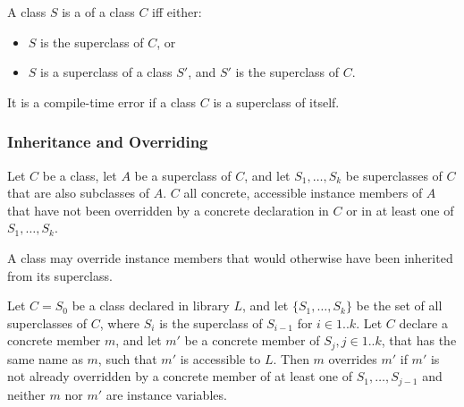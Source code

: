\documentclass[makeidx]{article}
\begin{document}
\LMHash{}%
A class $S$ is a  of a class $C$ if{}f either:
\begin{itemize}
\item $S$ is the superclass of $C$, or
\item $S$ is a superclass of a class $S'$,
and $S'$ is the superclass of $C$.
\end{itemize}

\LMHash{}%
It is a compile-time error if a class $C$ is a superclass of itself.


\subsubsection{Inheritance and Overriding}

\LMHash{}%
Let $C$ be a class, let $A$ be a superclass of $C$, and
let $S_1, \ldots, S_k$ be superclasses of $C$ that are also subclasses of $A$.
$C$  all concrete, accessible instance members of $A$
that have not been overridden by a concrete declaration in $C$ or in at least one of $S_1, \ldots, S_k$.


\LMHash{}%
A class may override instance members that would otherwise have been inherited from its superclass.

\LMHash{}%
Let $C = S_0$ be a class declared in library $L$, and
let $\{S_1, \ldots, S_k\}$ be the set of all superclasses of $C$,
where $S_i$ is the superclass of $S_{i-1}$ for $i \in 1 .. k$.
Let $C$ declare a concrete member $m$, and
let $m'$ be a concrete member of $S_j, j \in 1 .. k$, that has the same name as $m$,
such that $m'$ is accessible to $L$.
Then $m$ overrides $m'$
if $m'$ is not already overridden by a concrete member of at least one of $S_1, \ldots, S_{j-1}$
and neither $m$ nor $m'$ are instance variables.
\end{document}
